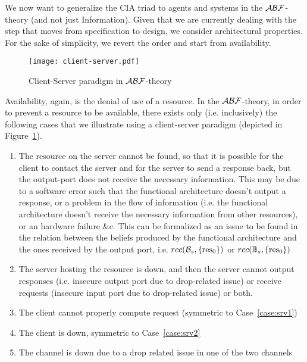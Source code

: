 We now want to generalize the CIA triad to agents and systems in the
$\mathcal{A}\mathcal{B}\mathcal{F}$-theory (and not just Information). Given that we are currently
dealing with the step that moves from specification to design, we consider
architectural properties. For the sake of simplicity, we revert the order and
start from availability.

\begin{figure}[t]
	\centering
	\texttt{[image: client-server.pdf]}
	\caption{Client-Server paradigm in $\mathcal{A}\mathcal{B}\mathcal{F}$-theory}
	\label{fig:client-server}
\end{figure}
Availability, again, is the denial of use of a resource. In the $\mathcal{A}\mathcal{B}\mathcal{F}$-theory, 
in order to prevent a resource to be available, there
exists only (i.e. inclusively) the following cases
that we illustrate using a client-server paradigm (depicted in Figure~\ref{fig:client-server}).
\begin{enumerate}
	\item\label{case:srv1} The resource on the server cannot be found, so that it is
		possible for the client to contact the server and for the server
		to send a response back, but the output-port does not receive the
		necessary information. This may be due to a software error such
		that the functional architecture doesn't output a response, or
		a problem in the flow of information (i.e. the functional
		architecture doesn't receive the necessary information from
		other resources), or an hardware failure \&c. This can be formalized
		as an issue to be found in the relation between the beliefs produced by the functional
		architecture and the ones received by the output port, i.e.
		$rcc(\mathcal{B}_s,\{\text{res}_0\})$ or 
		$rcc(\mathbb{B}_s,\{\text{res}_0\})$ 
	\item\label{case:srv2} The server hosting the resource is down, and then the server
		cannot output responses (i.e. insecure output port due to drop-related issue) or receive
		requests (insecure input port due to drop-related issue) or both.
	\item\label{case:srv3} The client cannot properly compute request (symmetric to Case~\ref{case:srv1})
	\item The client is down, symmetric to Case~\ref{case:srv2}
	\item The channel is down due to a drop related issue in one of the two channels 
\end{enumerate}
